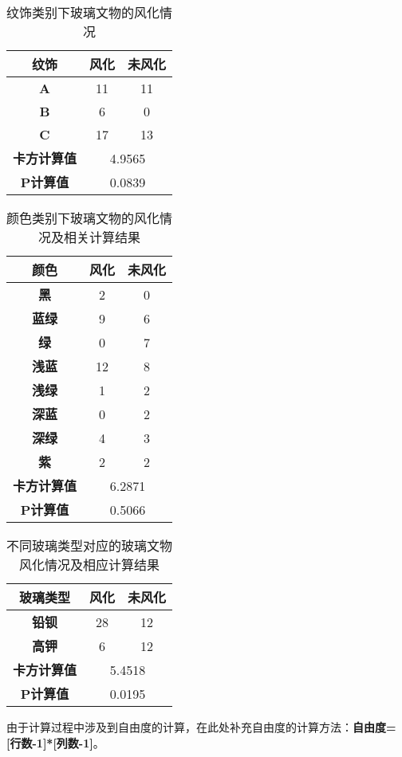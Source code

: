 \documentclass{MathModeling}
\begin{document}
	\begin{table}[hp]
		\centering
		\caption{纹饰类别下玻璃文物的风化情况}
		\begin{tabular}{ccc}
			\toprule
			\textbf{纹饰} & \multicolumn{1}{c}{\textbf{风化}} & \textbf{未风化} \\
			\midrule
			\textbf{A} & \multicolumn{1}{c}{11} & 11 \\
			\textbf{B} & \multicolumn{1}{c}{6} & 0 \\
			\textbf{C} & \multicolumn{1}{c}{17} & 13 \\
			\midrule
			\textbf{卡方计算值} & \multicolumn{2}{c}{4.9565} \\
			\midrule
			\textbf{P计算值} & \multicolumn{2}{c}{0.0839} \\
			\bottomrule
			\end{tabular}%
		\label{纹饰与风化}%
	  \end{table}%
	\begin{table}[hp]
	    \centering	
		\caption{颜色类别下玻璃文物的风化情况及相关计算结果}
		\begin{tabular}{ccc}
			\toprule
			\textbf{颜色} & \multicolumn{1}{c}{\textbf{风化}} & \textbf{未风化} \\
			\midrule
			\textbf{黑} & \multicolumn{1}{c}{2} & 0 \\
			\textbf{蓝绿} & \multicolumn{1}{c}{9} & 6 \\
			\textbf{绿} & \multicolumn{1}{c}{0} & 7 \\
			\textbf{浅蓝} & \multicolumn{1}{c}{12} & 8 \\
			\textbf{浅绿} & \multicolumn{1}{c}{1} & 2 \\
			\textbf{深蓝} & \multicolumn{1}{c}{0} & 2 \\
			\textbf{深绿} & \multicolumn{1}{c}{4} & 3 \\
			\textbf{紫} & \multicolumn{1}{c}{2} & 2 \\
			\midrule
			\textbf{卡方计算值} & \multicolumn{2}{c}{6.2871} \\
			\midrule
			\textbf{P计算值} & \multicolumn{2}{c}{0.5066} \\
			\bottomrule
			\end{tabular}%
		\label{颜色与风化}%
	  \end{table}%
	  \begin{table}[htp]
		\centering
  		\caption{不同玻璃类型对应的玻璃文物风化情况及相应计算结果}
    	  \begin{tabular}{ccc}
			\toprule
			\textbf{玻璃类型} & \multicolumn{1}{c}{\textbf{风化}} & \textbf{未风化} \\
			\midrule
			\textbf{铅钡} & \multicolumn{1}{c}{28} & 12 \\
			\textbf{高钾} & \multicolumn{1}{c}{6} & 12 \\
			\midrule
			\textbf{卡方计算值} & \multicolumn{2}{c}{5.4518} \\
			\midrule
			\textbf{P计算值} & \multicolumn{2}{c}{0.0195} \\
			\bottomrule
			\end{tabular}		
  		\label{玻璃类型与风化}
	  \end{table}
	由于计算过程中涉及到自由度的计算，在此处补充自由度的计算方法：{\textbf{自由度=[行数-1]*[列数-1]}}。
\end{document}
